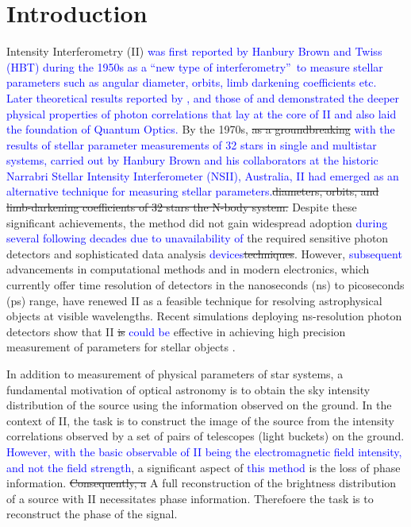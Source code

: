 \section{Introduction}

Intensity Interferometry (II) \textcolor{blue}{was first reported by Hanbury Brown and Twiss (HBT) during the 1950s \citep{brown1954lxxiv, HBT56} as a \textquotedblleft new type of interferometry\textquotedblright \ to measure stellar parameters such as angular diameter, orbits, limb darkening coefficients etc. Later theoretical results reported by 
\cite{brown1957interferometry, brown1958interferometry}, 
and those of \cite{glauber1963quantum} and 
\cite{MandelWolf1995, Hecht2002} demonstrated the deeper 
physical properties of photon correlations that lay at the 
core of II and also laid the foundation of Quantum Optics.}
By the 1970s, \st{as a groundbreaking} \textcolor{blue}
{with the results of stellar parameter measurements of 32 stars 
in single and multistar systems, 
carried out by Hanbury Brown and his collaborators \citep{hanbury1974angular} at the historic Narrabri Stellar Intensity Interferometer (NSII), Australia,  
II had emerged as an alternative technique 
for measuring stellar parameters.}\st{diameters, orbits, and limb-darkening 
coefficients of 32 stars the N-body system.} Despite these significant achievements,
the method did not gain 
widespread adoption \textcolor{blue}{during several following decades due to unavailability of} the required 
sensitive photon detectors and sophisticated data analysis 
\textcolor{blue}{devices}\st{techniques}. 
However, \textcolor{blue}{subsequent} advancements in computational 
methods and in modern electronics, which currently offer time resolution of detectors in the nanoseconds (ns) to picoseconds (ps) range, have renewed 
II as a feasible technique for resolving astrophysical objects at visible wavelengths. Recent 
 simulations deploying ns-resolution photon detectors show that II 
 \st{is} \textcolor{blue}{could be} effective 
 in achieving high precision measurement of parameters for stellar objects 
 \citep{10.1093/mnras/stab2391, 10.1093/mnras/stac2433}. 

In addition to measurement of physical parameters of star systems, a fundamental motivation of optical astronomy is to obtain the sky intensity distribution of the source using the information observed on the ground. In the context of II, the task is to construct the image of the source from the intensity correlations observed by a set of pairs of telescopes (light buckets) on the ground.  \textcolor{blue}{However, with the basic observable of II being the electromagnetic field intensity, and not the field strength},
 a significant aspect of \textcolor{blue}{this method} is the loss of phase information. \st{Consequently, a} A full 
 reconstruction of the brightness distribution of a source with II 
 necessitates phase information. Therefoere the task is to reconstruct the phase of the signal. 

